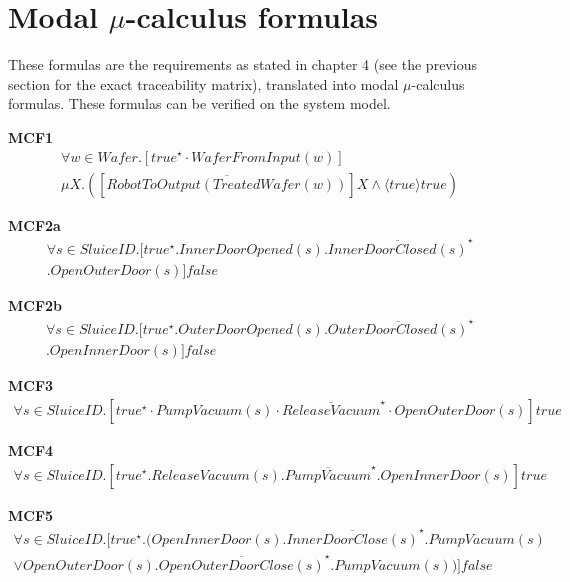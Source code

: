 \documentclass[12pt]{report}
\begin{document}
    \pagebreak

    \section{Modal $\mu$-calculus formulas}
    These formulas are the requirements as stated in chapter 4 (see the previous section for the exact traceability matrix), translated into modal $\mu$-calculus formulas. These formulas can be verified on the system model.

    \textbf{MCF1}
    \begin{multline*}
        \forall w \in \mathit{Wafer}. [true^{\star} \cdot \mathit{Wafer}FromInput(w)]\\
        \mu X.([\overline{RobotToOutput(Treated\mathit{Wafer}(w))}]X \wedge \langle true \rangle true)
    \end{multline*}

    \textbf{MCF2a}
    \begin{multline*}
        \forall s \in SluiceID.[true^{\star}.InnerDoorOpened(s).\overline{InnerDoorClosed(s)}^{\star}\\
        .OpenOuterDoor(s)]false
    \end{multline*}

    \textbf{MCF2b}
    \begin{multline*}
        \forall s \in SluiceID.[true^{\star}.OuterDoorOpened(s).\overline{OuterDoorClosed(s)}^{\star}\\
        .OpenInnerDoor(s)]false
    \end{multline*}

    \textbf{MCF3}
    \begin{multline*}
        \forall s \in SluiceID. [true^{\star} \cdot PumpVacuum(s) \cdot \overline{ReleaseVacuum}^{\star} \cdot OpenOuterDoor(s)]true
    \end{multline*}

    \textbf{MCF4}
    \begin{multline*}
        \forall s \in SluiceID.[true^{\star}.ReleaseVacuum(s).\overline{PumpVacuum}^{\star}.OpenInnerDoor(s)]true
    \end{multline*}

    \textbf{MCF5}
    \begin{multline*}
        \forall s \in SluiceID.[true^{\star}.(OpenInnerDoor(s).\overline{InnerDoorClose(s)}^{\star}.PumpVacuum(s)\\
        \vee OpenOuterDoor(s).\overline{OpenOuterDoorClose(s)}^{\star}.PumpVacuum(s))]false
    \end{multline*}
\end{document}
